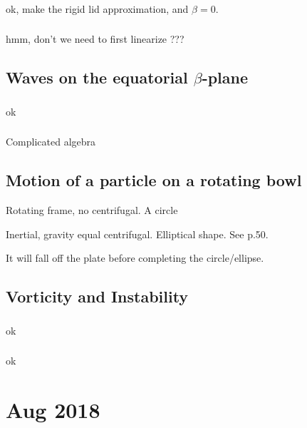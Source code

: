 \documentclass[11pt,letterpaper]{book}
\theoremstyle{definition}
\begin{document}
\subsection{}
ok, make the rigid lid approximation, and $\beta = 0$.

\subsection{}
hmm, don't we need to first linearize ???

\section{Waves on the equatorial $\beta$-plane}
\subsection{}
ok

\subsection{}
Complicated algebra

\section{Motion of a particle on a rotating bowl}
Rotating frame, no centrifugal. A circle

Inertial, gravity equal centrifugal. Elliptical shape. See \cite{cbr} p.50.

It will fall off the plate before completing the circle/ellipse.

\section{Vorticity and Instability}
\subsection{}
ok

\subsection{}
ok

\chapter{Aug 2018}
\section{}
\end{document}
